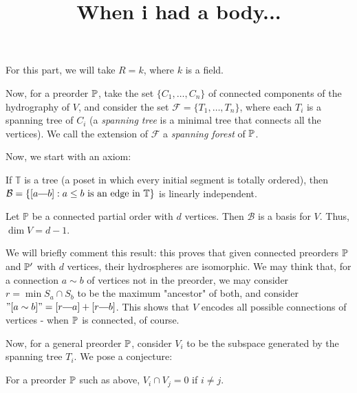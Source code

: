 
\title{When i had a body...}

	\maketitle
	\par For this part, we will take $R = k$, where $k$ is a field.
	\begin{definition}
		 Now, for a preorder $\mathbb{P}$, take the set $\{C_1, \dots, C_n\}$ of connected components of the hydrography of $V$, and consider the set $\mathcal{F} = \{T_1, \dots, T_n\}$, where each $T_i$ is a spanning tree of $C_i$ (a \textit{spanning tree} is a minimal tree that connects all the vertices).  We call the extension of $\mathcal{F}$ a \textit{spanning forest} of $\mathbb{P}$.
	\end{definition}
	Now, we start with an axiom:
	\begin{mata}
		If $\mathbb{T}$ is a tree (a poset in which every initial segment is totally ordered), then $\mathcal{B} = \{[a \connect b]: a \leq b \text{ is an edge in } \mathbb{T}\}$ is linearly independent.
	\end{mata}

	\begin{cor}
		Let $\mathbb{P}$ be a connected partial order with $d$ vertices. Then $\mathcal{B}$ is a basis for $V$. Thus, $\dim V = d - 1$.
	\end{cor}
	\par We will briefly comment this result: this proves that given connected preorders $\mathbb{P}$ and $\mathbb{P}'$ with $d$ vertices, their hydrospheres are isomorphic. We may think that, for a connection $a \sim b$ of vertices not in the preorder, we may consider $r = \min S_a \cap S_b$ to be the maximum "ancestor" of both, and consider $"[a \sim b]" = [r \connect a] + [r \connect b]$. This shows that $V$ encodes all possible connections of vertices - when $\mathbb{P}$ is connected, of course.
	\par Now, for a general preorder $\mathbb{P}$, consider $V_i$ to be the subspace generated by the spanning tree $T_i$. We pose a conjecture:
	\begin{conj}
		For a preorder $\mathbb{P}$ such as above, $V_i \cap V_j = 0$ if $i \neq j$.
	\end{conj}


